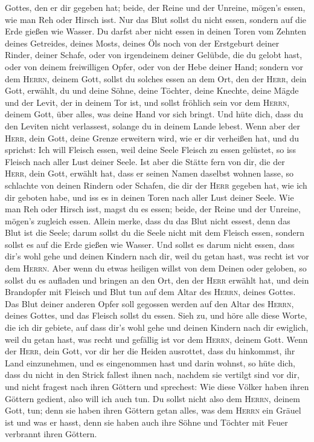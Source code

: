 Gottes, den er dir gegeben hat; beide, der Reine und der Unreine,
mögen's essen, wie man Reh oder Hirsch isst.  Nur das
Blut sollst du nicht essen, sondern auf die Erde gießen wie Wasser.
 Du darfst aber nicht essen in deinen Toren vom Zehnten
deines Getreides, deines Mosts, deines Öls noch von der Erstgeburt
deiner Rinder, deiner Schafe, oder von irgendeinem deiner Gelübde, die
du gelobt hast, oder von deinem freiwilligen Opfer, oder von der Hebe
deiner Hand;  sondern vor dem \textsc{Herrn}, deinem
Gott, sollst du solches essen an dem Ort, den der \textsc{Herr}, dein
Gott, erwählt, du und deine Söhne, deine Töchter, deine Knechte, deine
Mägde und der Levit, der in deinem Tor ist, und sollst fröhlich sein vor
dem \textsc{Herrn}, deinem Gott, über alles, was deine Hand vor sich
bringt.  Und hüte dich, dass du den Leviten nicht
verlassest, solange du in deinem Lande lebest.  Wenn aber
der \textsc{Herr}, dein Gott, deine Grenze erweitern wird, wie er dir
verheißen hat, und du sprichst: Ich will Fleisch essen, weil deine Seele
Fleisch zu essen gelüstet, so iss Fleisch nach aller Lust deiner Seele.
 Ist aber die Stätte fern von dir, die der \textsc{Herr},
dein Gott, erwählt hat, dass er seinen Namen daselbst wohnen lasse, so
schlachte von deinen Rindern oder Schafen, die dir der \textsc{Herr}
gegeben hat, wie ich dir geboten habe, und iss es in deinen Toren nach
aller Lust deiner Seele.  Wie man Reh oder Hirsch isst,
magst du es essen; beide, der Reine und der Unreine, mögen's zugleich
essen.  Allein merke, dass du das Blut nicht essest, denn
das Blut ist die Seele; darum sollst du die Seele nicht mit dem Fleisch
essen,  sondern sollst es auf die Erde gießen wie Wasser.
 Und sollst es darum nicht essen, dass dir's wohl gehe
und deinen Kindern nach dir, weil du getan hast, was recht ist vor dem
\textsc{Herrn}.  Aber wenn du etwas heiligen willst von
dem Deinen oder geloben, so sollst du es aufladen und bringen an den
Ort, den der \textsc{Herr} erwählt hat,  und dein
Brandopfer mit Fleisch und Blut tun auf dem Altar des \textsc{Herrn},
deines Gottes. Das Blut deiner anderen Opfer soll gegossen werden auf
den Altar des \textsc{Herrn}, deines Gottes, und das Fleisch sollst du
essen.  Sieh zu, und höre alle diese Worte, die ich dir
gebiete, auf dass dir's wohl gehe und deinen Kindern nach dir ewiglich,
weil du getan hast, was recht und gefällig ist vor dem \textsc{Herrn},
deinem Gott.  Wenn der \textsc{Herr}, dein Gott, vor dir
her die Heiden ausrottet, dass du hinkommst, ihr Land einzunehmen, und
es eingenommen hast und darin wohnst,  so hüte dich, dass
du nicht in den Strick fallest ihnen nach, nachdem sie vertilgt sind vor
dir, und nicht fragest nach ihren Göttern und sprechest: Wie diese
Völker haben ihren Göttern gedient, also will ich auch tun.
 Du sollst nicht also dem \textsc{Herrn}, deinem Gott,
tun; denn sie haben ihren Göttern getan alles, was dem \textsc{Herrn}
ein Gräuel ist und was er hasst, denn sie haben auch ihre Söhne und
Töchter mit Feuer verbrannt ihren Göttern.

